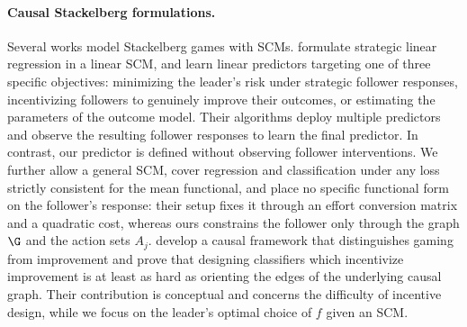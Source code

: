 \paragraph{Causal Stackelberg formulations.}
Several works model Stackelberg games with SCMs. 
\citet{shavitCausalStrategicLinear2022} formulate strategic linear regression in a linear SCM, and learn linear predictors targeting one of three specific objectives: minimizing the leader's risk under strategic follower responses, incentivizing followers to genuinely improve their outcomes, or estimating the parameters of the outcome model. Their algorithms deploy multiple predictors and observe the resulting follower responses to learn the final predictor. In contrast, our predictor is defined without observing follower interventions. We further allow a general SCM, cover regression and classification under any loss strictly consistent for the mean functional, and place no specific functional form on the follower's response: their setup fixes it through an effort conversion matrix and a quadratic cost, whereas ours constrains the follower only through the graph $\G$ and the action sets $A_j$.
\citet{miller2020strategic} develop a causal framework that distinguishes gaming from improvement and prove that designing classifiers which incentivize improvement is at least as hard as orienting the edges of the underlying causal graph. Their contribution is conceptual and concerns the difficulty of incentive design, while we focus on the leader's optimal choice of $f$ given an SCM.
